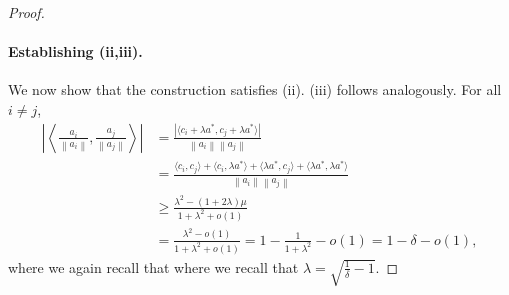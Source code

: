 \documentclass[10pt,a4paper]{amsart}
\newcommand{\norm}[1]{\left\|#1\right\|}
\begin{document}
\begin{proof}
    \paragraph{Establishing (ii,iii).} We now show that the construction satisfies (ii). (iii) follows analogously. For all $i\neq j$,
     \begin{align}
        \left|\left\langle \frac{a_i}{\norm{a_i}}, \frac{a_j}{\norm{a_j}} \right\rangle\right|
        &= \frac{|\langle c_i + \lambda a^*, c_j + \lambda a^*\rangle|}{\norm{a_i}\norm{a_j}}\\
        &= \frac{\langle c_i, c_j\rangle + \langle c_i, \lambda a^*\rangle + \langle \lambda a^*, c_j \rangle + \langle \lambda a^*, \lambda a^* \rangle}{\norm{a_i}\norm{a_j}}\\
        &\ge \frac{\lambda^2 - (1 + 2\lambda)\mu}{1 + \lambda^2 + o(1)}\\
        &= \frac{\lambda^2 - o(1)}{1 + \lambda^2 + o(1)} = 1 - \frac{1}{1 + \lambda^2} - o(1) = 1 - \delta - o(1),
    \end{align}
    where we again recall that where we recall that $\lambda = \sqrt{\frac{1}{\delta} - 1}.$
    
\end{proof}
\end{document}
